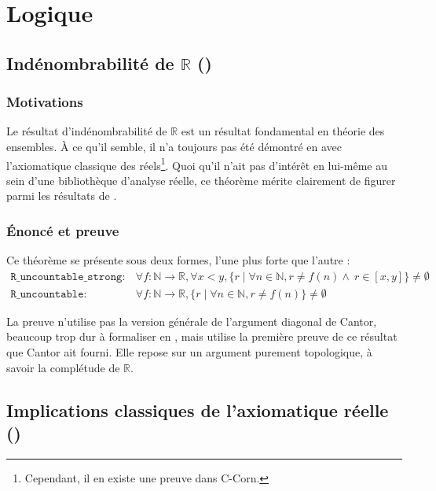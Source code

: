 \section{Logique}

\subsection{Indénombrabilité de $\mathbb{R}$ ()}

\subsubsection{Motivations}

Le résultat d'indénombrabilité de $\mathbb{R}$ est un résultat fondamental en théorie des ensembles. À ce qu'il semble, il n'a toujours pas été démontré en \coq{} avec l'axiomatique classique des réels\footnote{Cependant, il en existe une preuve dans C-Corn.}. Quoi qu'il n'ait pas d'intérêt en lui-même au sein d'une bibliothèque d'analyse réelle, ce théorème mérite clairement de figurer parmi les résultats de .

\subsubsection{Énoncé et preuve}

Ce théorème se présente sous deux formes, l'une plus forte que l'autre :
$$\begin{array}{ll}
\mathtt{R\_uncountable\_strong} :& \forall f : \mathbb{N}\rightarrow\mathbb{R}, \forall x < y, \{r\mid\forall n\in\mathbb{N}, r \neq f(n) \wedge\ r\in[x, y]\}\neq\emptyset\\
\mathtt{R\_uncountable} :& \forall f : \mathbb{N}\rightarrow\mathbb{R}, \{r\mid\forall n\in\mathbb{N}, r \neq f(n)\}\neq\emptyset
\end{array}$$

La preuve n'utilise pas la version générale de l'argument diagonal de Cantor, beaucoup trop dur à formaliser en \coq{}, mais utilise la première preuve de ce résultat que Cantor ait fourni. Elle repose sur un argument purement topologique, à savoir la complétude de $\mathbb{R}$.

\subsection{Implications classiques de l'axiomatique réelle ()}

